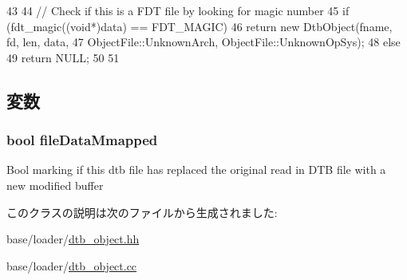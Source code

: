 \begin{DoxyCode}
43 {
44     // Check if this is a FDT file by looking for magic number
45     if (fdt_magic((void*)data) == FDT_MAGIC) {
46         return new DtbObject(fname, fd, len, data,
47                              ObjectFile::UnknownArch, ObjectFile::UnknownOpSys);
48     } else {
49         return NULL;
50     }
51 }
\end{DoxyCode}


\subsection{変数}
\hypertarget{classDtbObject_a7fb4f2b3db8f5603574f0e9cc114c360}{
\subsubsection[{fileDataMmapped}]{\setlength{\rightskip}{0pt plus 5cm}bool {\bf fileDataMmapped}}}
\label{classDtbObject_a7fb4f2b3db8f5603574f0e9cc114c360}
Bool marking if this dtb file has replaced the original read in DTB file with a new modified buffer 

このクラスの説明は次のファイルから生成されました:\begin{DoxyCompactItemize}
\item 
base/loader/\hyperlink{dtb__object_8hh}{dtb\_\-object.hh}\item 
base/loader/\hyperlink{dtb__object_8cc}{dtb\_\-object.cc}\end{DoxyCompactItemize}
